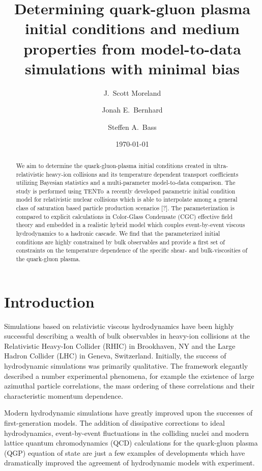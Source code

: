 \documentclass[aps,prc,reprint,amsmath,nofootinbib]{revtex4-1}
\newcommand{\trento}{T\raisebox{-0.5ex}{R}ENTo}
\begin{document}
\title{Determining quark-gluon plasma initial conditions and medium \\ properties from model-to-data simulations with minimal bias}
\author{J.\ Scott Moreland}
\author{Jonah E.\ Bernhard}
\author{Steffen A.\ Bass}
\date{\today}


\begin{abstract}
We aim to determine the quark-gluon-plasma initial conditions created in ultra-relativistic heavy-ion collisions and its temperature dependent transport coefficients utilizing Bayesian statistics and a multi-parameter model-to-data comparison.
The study is performed using \trento\ a recently developed parametric initial condition model for relativistic nuclear collisions which is able to interpolate among a general class of saturation based particle production scenarios [?].
The parameterization is compared to explicit calculations in Color-Glass Condensate (CGC) effective field theory and embedded in a realistic hybrid model which couples event-by-event viscous hydrodynamics to a hadronic cascade.
We find that the parameterized initial conditions are highly constrained by bulk observables and provide a first set of constraints on the temperature dependence of the specific shear- and bulk-viscosities of the quark-gluon plasma.
\end{abstract}


\maketitle

\section{Introduction}

Simulations based on relativistic viscous hydrodynamics have been highly successful describing a wealth of bulk observables in heavy-ion collisions at the Relativistic Heavy-Ion Collider (RHIC) in Brookhaven, NY and the Large Hadron Collider (LHC) in Geneva, Switzerland.
Initially, the success of hydrodynamic simulations was primarily qualitative. The framework elegantly described a number experimental phenomena, for example the existence of large azimuthal particle correlations, the mass ordering of these correlations and their characteristic momentum dependence.

Modern hydrodynamic simulations have greatly improved upon the successes of first-generation models.
The addition of dissipative corrections to ideal hydrodynamics, event-by-event fluctuations in the colliding nuclei and modern lattice quantum chromodynamics (QCD) calculations for the quark-gluon plasma (QGP) equation of state are just a few examples of developments which have dramatically improved the agreement of hydrodynamic models with experiment.
\end{document}
